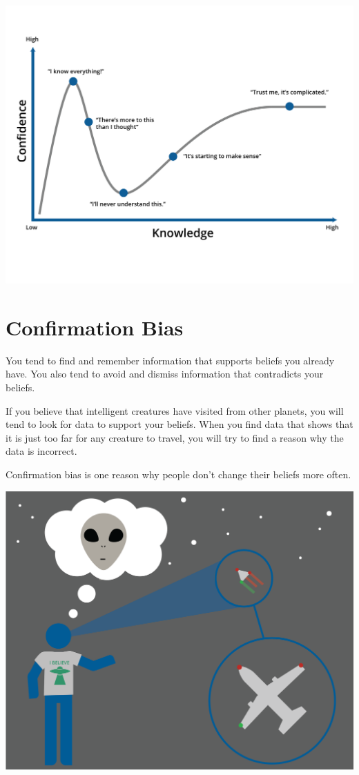 \includegraphics[width=1\textwidth]{dunningKruger.png}

\section{Confirmation Bias}

You tend to find and remember information that supports
beliefs you already have. You also tend to avoid and dismiss information
that contradicts your beliefs.

If you believe that intelligent creatures have visited from other
planets, you will tend to look for data to support your beliefs. When
you find data that shows that it is just too far for any creature to
travel, you will try to find a reason why the data is incorrect.

Confirmation bias is one reason why people don't change their beliefs
more often.

\includegraphics[width=1\textwidth]{confirmationBias.png}


